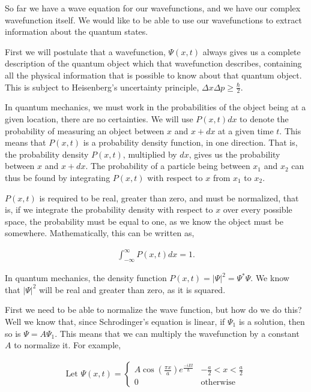 \documentclass[11pt]{amsart}
\begin{document}
So far we have a wave equation for our wavefunctions, and we have our complex wavefunction itself. We would like to be able to use our wavefunctions to extract information about the quantum states.

First we will postulate that a wavefunction, $\Psi(x, t)$ always gives us a complete description of the quantum object which that wavefunction describes, containing all the physical information that is possible to know about that quantum object. This is subject to Heisenberg's uncertainty principle, $\Delta x\Delta p \geq \frac{\hbar}{2}$.

In quantum mechanics, we must work in the probabilities of the object being at a given location, there are no certainties. We will use $P(x, t) dx$ to denote the probability of measuring an object between $x$ and $x + dx$ at a given time $t$. This means that $P(x, t)$ is a probability density function, in one direction. That is, the probability density $P(x, t)$, multiplied by $dx$, gives us the probability between $x$ and $x + dx$. The probability of a particle being between $x_1$ and $x_2$ can
thus be found by integrating $P(x, t)$ with respect to $x$ from $x_1$ to $x_2$.

$P(x, t)$ is required to be real, greater than zero, and must be normalized, that is, if we integrate the probability density with respect to $x$ over every possible space, the probability must be equal to one, as we know the object must be somewhere. Mathematically, this can be written as,

\begin{align*}
  \int_{-\infty}^{\infty} P(x, t) dx = 1.
\end{align*}

In quantum mechanics, the density function $P(x, t) = {|\Psi|}^2 = \Psi^* \Psi$. We know that ${|\Psi|}^2$ will be real and greater than zero, as it is squared.

First we need to be able to normalize the wave function, but how do we do this? Well we know that, since Schrodinger's equation is linear, if $\Psi_1$ is a solution, then so is $\Psi = A\Psi_1$. This means that we can multiply the wavefunction by a constant $A$ to normalize it. For example,

\begin{align*}
  \text{Let } \Psi(x, t) =
  \begin{cases}
    A\cos{\left(\frac{\pi x}{a}\right)} e^{\frac{-iEt}{\hbar}} & -\frac{a}{2} < x < \frac{a}{2} \\
    0 & \text{otherwise}
  \end{cases}
\end{align*}
\end{document}
